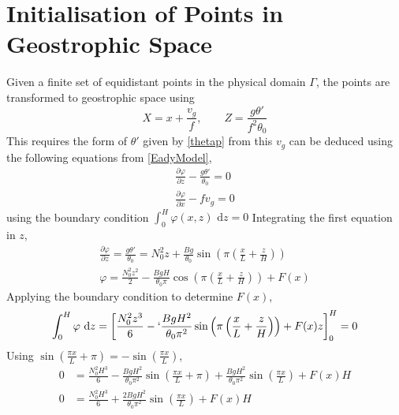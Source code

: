 \section{Initialisation of Points in Geostrophic Space \label{Initpoints}}
Given a finite set of equidistant points in the physical domain $\Gamma$, the points are transformed to geostrophic space using
\begin{equation}
X = x + \frac{v_g}{f}, \qquad Z = \frac{g\theta'}{f^2\theta_0}
\label{geostrophictransformation}
\end{equation}
This requires the form of $\theta'$ given by \ref{thetap} from this $v_g$ can be deduced using the following equations from \ref{EadyModel},
\begin{equation}
	\begin{aligned}
		\frac{\partial \varphi}{\partial z} - \frac{g \theta'}{\theta_0} = 0\\
		\frac{\partial \varphi}{\partial x} - fv_g = 0
	\end{aligned}
\label{findingvg}
\end{equation}
using the boundary condition $\int_{0}^{H}\varphi(x,z)\text{ d}z = 0$
Integrating the first equation in $z$,
\begin{equation*}
	\begin{aligned}
	\frac{\partial \varphi}{\partial z} = \frac{g \theta'}{\theta_0} = N_0^2z + \frac{Bg}{\theta_0}\sin\left(\pi\left(\frac{x}{L}+\frac{z}{H}\right) \right)\\
	\varphi = \frac{N_0^2z^2}{2} - \frac{BgH}{\theta_0\pi}\cos\left(\pi\left(\frac{x}{L}+\frac{z}{H}\right)\right) + F(x)
	\end{aligned}
\end{equation*}
Applying the boundary condition to determine $F(x)$,
\begin{equation*}
	\begin{aligned}
	\int_{0}^{H}\varphi \text{ d}z = \left[ \frac{N_0^2z^3}{6} -`  \frac{BgH^2}{\theta_0\pi^2}\sin\left(\pi\left(\frac{x}{L}+\frac{z}{H}\right) \right) + F(x)z\right]_{0}^{H} = 0
	\end{aligned}
\end{equation*}
Using $\sin\left(\frac{\pi x}{L}+\pi\right) = -\sin\left(\frac{\pi x}{L}\right)$,
\begin{equation*}
\begin{aligned}
 0 & =\frac{N_0^2H^3}{6} - \frac{BgH^2}{\theta_0\pi^2}\sin\left(\frac{\pi x}{L}+\pi\right)+ \frac{BgH^2}{\theta_0\pi^2}\sin\left(\frac{\pi x}{L}\right) + F(x)H\\
 0 & =\frac{N_0^2H^3}{6} + \frac{2BgH^2}{\theta_0\pi^2}\sin\left(\frac{\pi x}{L}\right) + F(x)H
\end{aligned}
\end{equation*}
